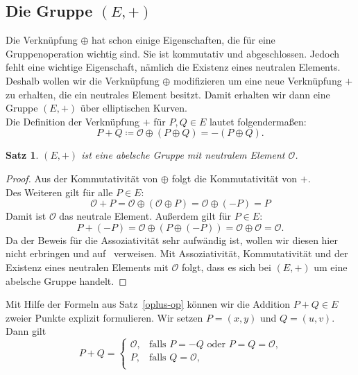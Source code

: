 \documentclass[hidelinks]{article}
\theoremstyle{plain}
\newtheorem{thm}{Satz}[section]
\theoremstyle{definition}
\theoremstyle{rem}
\newcommand{\patinf}{\mathcal{O}}
\begin{document}
\begin{sloppypar}
\subsection{Die Gruppe $(E, +)$}
Die Verknüpfung $\oplus$ hat schon einige Eigenschaften, die für eine Gruppenoperation wichtig sind.
Sie ist kommutativ und abgeschlossen. Jedoch fehlt eine wichtige Eigenschaft, nämlich die Existenz eines neutralen Elements.
Deshalb wollen wir die Verknüpfung $\oplus$ modifizieren um eine neue Verknüpfung $+$ zu erhalten, die ein neutrales Element besitzt. 
Damit erhalten wir dann eine Gruppe $(E, +)$ über elliptischen Kurven. \\
Die Definition der Verknüpfung $+$ für $P, Q \in E$ lautet folgendermaßen:
\begin{equation*} \label{plus-op}
    P + Q \coloneqq \patinf \oplus (P \oplus Q) = -(P \oplus Q).
\end{equation*}
\begin{thm}
    $(E, +)$ ist eine abelsche Gruppe mit neutralem Element $\patinf$.
\end{thm}
\begin{proof}
    Aus der Kommutativität von $\oplus$ folgt die Kommutativität von $+$. \\
    Des Weiteren gilt für alle $P \in E$:
    \begin{equation*}
        \patinf + P = \patinf \oplus (\patinf \oplus P) = \patinf \oplus (-P) = P
    \end{equation*}
    Damit ist $\patinf$ das neutrale Element. Außerdem gilt für $P \in E$:
    \begin{equation*}
        P + (-P) = \patinf \oplus (P \oplus (-P)) = \patinf \oplus \patinf = \patinf.
    \end{equation*}
    Da der Beweis für die Assoziativität sehr aufwändig ist, wollen wir diesen hier nicht erbringen und auf~\cite[Seite~20]{washington} verweisen.
    Mit Assoziativität, Kommutativität und der Existenz eines neutralen Elements mit $\patinf$ folgt, dass es sich bei $(E, +)$ um eine abelsche Gruppe handelt.
\end{proof}
Mit Hilfe der Formeln aus Satz~\ref{oplus-op} können wir die Addition $P + Q \in E$ zweier Punkte explizit formulieren.
Wir setzen $P = (x,y)$ und $Q = (u,v)$. Dann gilt 
\begin{equation*} \label{addition-faelle}
    P + Q = \begin{cases}
        \patinf, & \text{falls $P=-Q$ oder $P=Q=\patinf$,} \\
        P, & \text{falls $Q=\patinf$,} \\

\end{cases}
\end{equation*}
\end{sloppypar}
\end{document}
